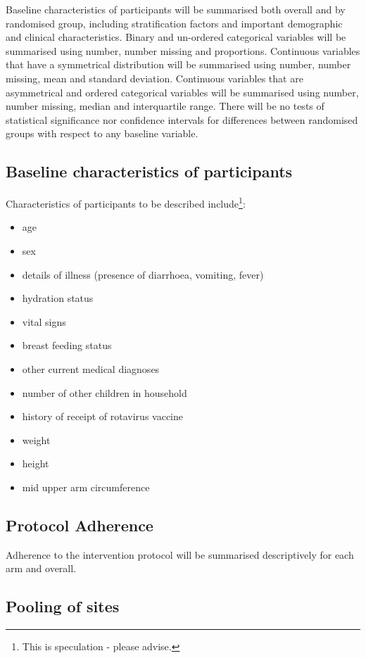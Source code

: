 \documentclass[a4paper]{article}
\begin{document}
Baseline characteristics of participants will be summarised both overall and by randomised group, including stratification factors and important demographic and clinical characteristics.
Binary and un-ordered categorical variables will be summarised using number, number missing and proportions.
Continuous variables that have a symmetrical distribution will be summarised using number, number missing, mean and standard deviation.
Continuous variables that are asymmetrical and ordered categorical variables will be summarised using number, number missing, median and interquartile range.
There will be no tests of statistical significance nor confidence intervals for differences between randomised groups with respect to any baseline variable.

\subsection{Baseline characteristics of participants}

Characteristics of participants to be described include\footnote{This is speculation - please advise.}:

\begin{itemize}
    \item age
    \item sex
    \item details of illness (presence of diarrhoea, vomiting, fever)
    \item hydration status
    \item vital signs
    \item breast feeding status
    \item other current medical diagnoses
    \item number of other children in household
    \item history of receipt of rotavirus vaccine
    \item weight
    \item height
    \item mid upper arm circumference
\end{itemize}


\subsection{Protocol Adherence}

Adherence to the intervention protocol will be summarised descriptively for each arm and overall.

\subsection{Pooling of sites}
\end{document}
